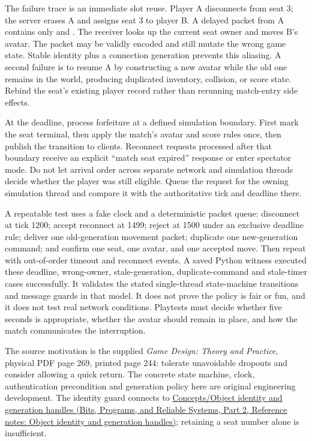 The failure trace is an immediate slot reuse. Player A disconnects from seat 3; the server erases A and assigns seat 3 to player B. A delayed packet from A contains only  and . The receiver looks up the current seat owner and moves B's avatar. The packet may be validly encoded and still mutate the wrong game state. Stable identity plus a connection generation prevents this aliasing. A second failure is to resume A by constructing a new avatar while the old one remains in the world, producing duplicated inventory, collision, or score state. Rebind the seat's existing player record rather than rerunning match-entry side effects.

At the deadline, process forfeiture at a defined simulation boundary. First mark the seat terminal, then apply the match's avatar and score rules once, then publish the transition to clients. Reconnect requests processed after that boundary receive an explicit ``match seat expired'' response or enter spectator mode. Do not let arrival order across separate network and simulation threads decide whether the player was still eligible. Queue the request for the owning simulation thread and compare it with the authoritative tick and deadline there.

A repeatable test uses a fake clock and a deterministic packet queue: disconnect at tick 1200; accept reconnect at 1499; reject at 1500 under an exclusive deadline rule; deliver one old-generation movement packet; duplicate one new-generation command; and confirm one seat, one avatar, and one accepted move. Then repeat with out-of-order timeout and reconnect events. A saved Python witness executed these deadline, wrong-owner, stale-generation, duplicate-command and stale-timer cases successfully. It validates the stated single-thread state-machine transitions and message guards in that model. It does not prove the policy is fair or fun, and it does not test real network conditions. Playtests must decide whether five seconds is appropriate, whether the avatar should remain in place, and how the match communicates the interruption.

The source motivation is the supplied \emph{Game Design: Theory and Practice}, physical PDF page 269, printed page 244: tolerate unavoidable dropouts and consider allowing a quick return. The concrete state machine, clock, authentication precondition and generation policy here are original engineering development. The identity guard connects to \href{../01-Bits-Programs-and-Reliable-Systems-P02/main.pdf\#nameddest=appendix-f1581457d322}{Concepts/Object identity and generation handles (Bits, Programs, and Reliable Systems, Part 2, Reference notes: Object identity and generation handles)}; retaining a seat number alone is insufficient.

